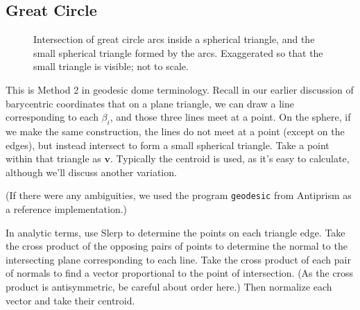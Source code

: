 \documentclass{amsart}[12pt]
\begin{document}
\subsection{Great Circle}
\begin{figure}%
\caption{Intersection of great circle arcs inside a spherical triangle,
and the small spherical triangle formed by the arcs. Exaggerated so that the
small triangle is visible; not to scale.}
\label{fig:intlines}
\end{figure}
This is Method 2 in geodesic dome terminology. Recall in our earlier discussion
of barycentric coordinates that on a plane triangle, we can draw a line
corresponding to each $\beta_i$, and those three lines meet at a point. On the
sphere, if we make the same construction, the lines do not meet at a point
(except on the edges), but instead intersect to form a small spherical
triangle. Take a point within that triangle as $\mathbf v$.
Typically the centroid is used, as it's easy to calculate,
although we'll discuss another variation.

(If there were any ambiguities, we used the program \texttt{geodesic}
from Antiprism\cite{antiprism} as a reference implementation.)

In analytic terms, use Slerp to determine the points on each triangle edge.
Take the cross product of the opposing pairs of points to determine the normal
to the intersecting plane corresponding to each line. Take the cross product of
each pair of normals to find a vector proportional to the point of
intersection. (As the cross product is antisymmetric, be careful about order
here.) Then normalize each vector and take their centroid.
\end{document}
